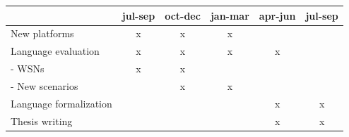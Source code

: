 \documentclass[pdftex,12pt,a4paper]{article}
\begin{document}
\begin{table}[h]
\begin{center}
\begin{tabular}{ | l | c | c | c | c | c | }
\hline
 & jul-sep & oct-dec & jan-mar & apr-jun & jul-sep \\ \hline
New platforms          & x & x & x &   &   \\ \hline
Language evaluation    & x & x & x & x &   \\ \hline
    - WSNs             & x & x &   &   &   \\ \hline
    - New scenarios    &   & x & x &   &   \\ \hline
Language formalization &   &   &   & x & x \\ \hline
Thesis writing         &   &   &   & x & x \\ \hline
\end{tabular}
\end{center}
\end{table}
\end{document}
